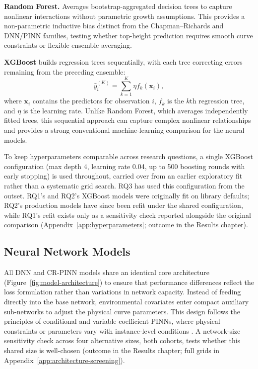 \documentclass[11pt,a4paper]{report}
\begin{document}
\textbf{Random Forest.} Averages bootstrap-aggregated decision trees to capture nonlinear interactions without parametric growth assumptions. This provides a non-parametric inductive bias distinct from the Chapman--Richards and DNN/PINN families, testing whether top-height prediction requires smooth curve constraints or flexible ensemble averaging.

\textbf{XGBoost} builds regression trees sequentially, with each tree correcting errors remaining from the preceding ensemble:
\begin{equation}
\hat{y}_i^{(K)} = \sum_{k=1}^{K}\eta f_k(\mathbf{x}_i),
\end{equation}
where $\mathbf{x}_i$ contains the predictors for observation $i$, $f_k$ is the $k$th regression tree, and $\eta$ is the learning rate. Unlike Random Forest, which averages independently fitted trees, this sequential approach can capture complex nonlinear relationships and provides a strong conventional machine-learning comparison for the neural models.

To keep hyperparameters comparable across research questions, a single XGBoost configuration (max depth 4, learning rate 0.04, up to 500 boosting rounds with early stopping) is used throughout, carried over from an earlier exploratory fit rather than a systematic grid search. RQ3 has used this configuration from the outset. RQ1's and RQ2's XGBoost models were originally fit on library defaults; RQ2's production models have since been refit under the shared configuration, while RQ1's refit exists only as a sensitivity check reported alongside the original comparison (Appendix~\ref{app:hyperparameters}; outcome in the Results chapter).

\subsection{Neural Network Models}
\label{sec:rq1-pinn-loss}
All DNN and CR-PINN models share an identical core architecture (Figure~\ref{fig:model-architecture}) to ensure that performance differences reflect the loss formulation rather than variations in network capacity. Instead of feeding directly into the base network, environmental covariates enter compact auxiliary sub-networks to adjust the physical curve parameters. This design follows the principles of conditional and variable-coefficient PINNs, where physical constraints or parameters vary with instance-level conditions \citep{kovacs2022Conditional_C4_NN,miao2023VCPINN_C4_NN}. A network-size sensitivity check across four alternative sizes, both cohorts, tests whether this shared size is well-chosen (outcome in the Results chapter; full grids in Appendix~\ref{app:architecture-screening}).
\end{document}
